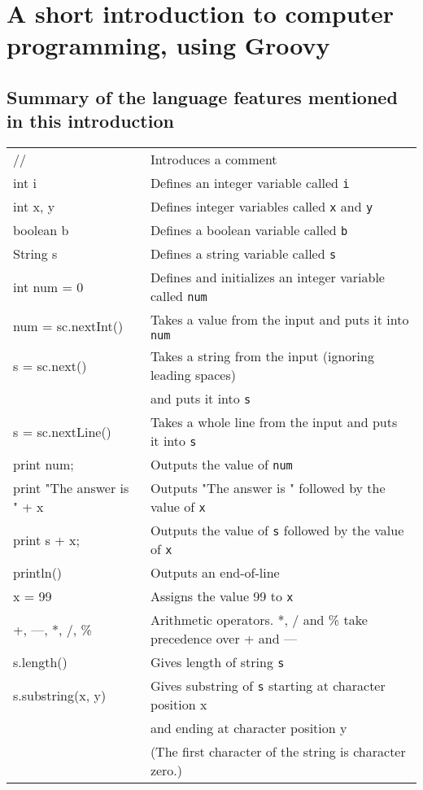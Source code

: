\section{A short introduction to computer programming, using Groovy}

\subsection{Summary of the language features mentioned in this introduction}

\begin{tabular}{@{\ttfamily}l l}
// & Introduces a comment\\
int i & Defines an integer variable called \texttt{i}\\
int x, y & Defines integer variables called \texttt{x} and \texttt{y}\\
boolean b & Defines a boolean variable called \texttt{b}\\
String s & Defines a string variable called \texttt{s}\\
int num = 0 & Defines and initializes an integer variable called \texttt{num}\\
num = sc.nextInt() & Takes a value from the input and puts it into \texttt{num}\\
s = sc.next() & Takes a string from the input (ignoring leading spaces) \\
& and puts it into \texttt{s}\\
s = sc.nextLine() & Takes a whole line from the input and puts it into \texttt{s}\\
print num; & Outputs the value of \texttt{num}\\
print "The answer is " + x & Outputs "The answer is " followed by the value of \texttt{x}\\
print  s + x; & Outputs the value of \texttt{s} followed by the value of \texttt{x}\\
println() & Outputs an end-of-line\\
x = 99 & Assigns the value 99 to \texttt{x}\\
+, ---, *, /, \% & Arithmetic operators.  *, / and \% take precedence over + and ---\\
s.length() & Gives length of string \texttt{s}\\
s.substring(x, y) & Gives substring of \texttt{s} starting at character position x \\
& and ending at character position y\\
 & (The first character of the string is character zero.)\\

\end{tabular}
